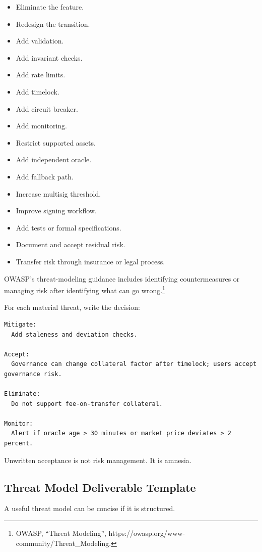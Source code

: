 \begin{itemize}
\tightlist
\item
  Eliminate the feature.
\item
  Redesign the transition.
\item
  Add validation.
\item
  Add invariant checks.
\item
  Add rate limits.
\item
  Add timelock.
\item
  Add circuit breaker.
\item
  Add monitoring.
\item
  Restrict supported assets.
\item
  Add independent oracle.
\item
  Add fallback path.
\item
  Increase multisig threshold.
\item
  Improve signing workflow.
\item
  Add tests or formal specifications.
\item
  Document and accept residual risk.
\item
  Transfer risk through insurance or legal process.
\end{itemize}

OWASP's threat-modeling guidance includes identifying countermeasures or
managing risk after identifying what can go wrong.\footnote{OWASP,
  ``Threat Modeling'', https://owasp.org/www-community/Threat\_Modeling.}

For each material threat, write the decision:

\begin{lstlisting}
Mitigate:
  Add staleness and deviation checks.

Accept:
  Governance can change collateral factor after timelock; users accept governance risk.

Eliminate:
  Do not support fee-on-transfer collateral.

Monitor:
  Alert if oracle age > 30 minutes or market price deviates > 2 percent.
\end{lstlisting}

Unwritten acceptance is not risk management. It is amnesia.

\subsection{Threat Model Deliverable Template}

A useful threat model can be concise if it is structured.

